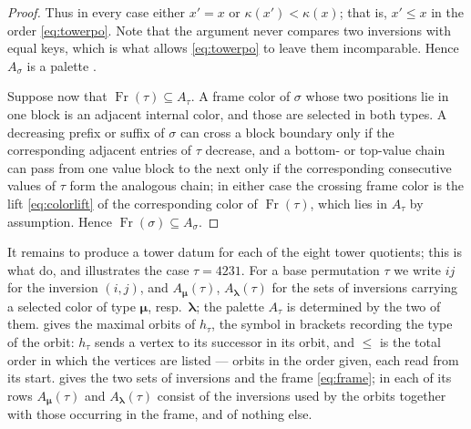 \documentclass[12pt]{article}
\def\xspace{ }%
\theoremstyle{definition}
\newcommand{\pal}{palette\xspace}      %
\newcommand{\pset}{A}                  %
\newcommand{\Fr}{\operatorname{Fr}}    %
\newcommand{\blam}{\boldsymbol{\lambda}}   %
\newcommand{\bmu}{\boldsymbol{\mu}}        %
\begin{document}
\begin{proof}
Thus in every case either $x' = x$ or $\kappa(x') < \kappa(x)$; that is,
$x' \le x$ in the order \eqref{eq:towerpo}. Note that the argument never
compares two inversions with equal keys, which is what allows
\eqref{eq:towerpo} to leave them incomparable. Hence $\pset_\sigma$ is a
\pal.

Suppose now that $\Fr(\tau) \subseteq \pset_\tau$. A frame color of $\sigma$
whose two positions lie in one block is an adjacent internal color, and
those are selected in both types. A decreasing prefix or suffix of
$\sigma$ can cross a block boundary only if the corresponding adjacent
entries of $\tau$ decrease, and a bottom- or top-value chain can pass from
one value block to the next only if the corresponding consecutive values
of $\tau$ form the analogous chain; in either case the crossing frame
color is the lift \eqref{eq:colorlift} of the corresponding color of
$\Fr(\tau)$, which lies in $\pset_\tau$ by assumption. Hence $\Fr(\sigma)
\subseteq \pset_\sigma$.
\end{proof}

It remains to produce a tower datum for each of the eight tower
quotients; this is what  do, and 
illustrates the case $\tau = 4231$. For a base
permutation $\tau$ we write $ij$ for the inversion $(i,j)$, and
$\pset_{\bmu}(\tau)$, $\pset_{\blam}(\tau)$ for the sets of inversions
carrying a selected color of type $\bmu$, resp.\ $\blam$; the \pal
$\pset_\tau$ is determined by the two of them.  gives the maximal orbits
of $h_\tau$, the symbol in brackets recording the type of the orbit:
$h_\tau$ sends a vertex to its successor in its orbit, and $\le$ is the
total order in which the vertices are listed --- orbits in the order
given, each read from its start.  gives the two sets of
inversions and the frame \eqref{eq:frame}; in each of its rows
$\pset_{\bmu}(\tau)$ and $\pset_{\blam}(\tau)$ consist of the inversions used by
the orbits together with those occurring in the frame, and of nothing
else.
\end{document}
